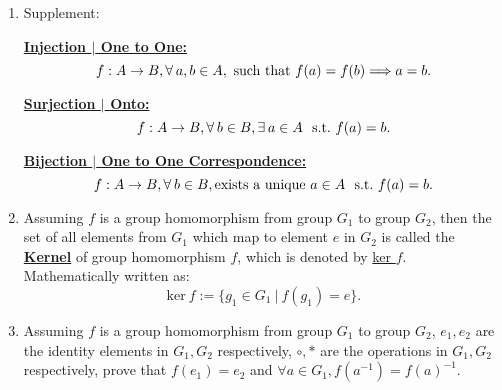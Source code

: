 \documentclass[12pt]{scrartcl}
\begin{document}
{{\begin{enumerate}[label=(\alph*)]
\begin{spacing}{1.2}
\setlength{\leftskip}{0pt}If a \underline{Group Homomorphism} $f$ is a bijection (one-to-one correspondence, invertible), 

\setlength{\leftskip}{24pt}$f$ is called an \underline{\textbf{Isomorphism}}, and $G_1$ and $G_2$ are \underline{\textbf{Isomorphic}}, which is denoted by $G_1 \cong G_2.$
\end{spacing}

	\item Supplement:

\vspace{0.2em}
\underline{\textbf{Injection $|$ One to One:}} $$f: A \rightarrow B, \forall \hspace{0.2em} a, b \in A, \text{~such that }f(a) = f(b) \Longrightarrow a = b.$$

\underline{\textbf{Surjection $|$ Onto:}} $$f: A \rightarrow B, \forall \hspace{0.2em} b \in B, \exists \hspace{0.2em} a \in A \text{~ s.t.} ~ f(a) = b.$$

\underline{\textbf{Bijection $|$ One to One Correspondence:}} $$f: A \rightarrow B, \forall \hspace{0.2em} b \in B, \text{exists a unique} ~ a \in A \text{~ s.t.} ~ f(a) = b.$$

	\item \begin{spacing}{1.3}Assuming $f$ is a group homomorphism from group $G_1$ to group $G_2$, then the set of all elements from $G_1$ which map to element $e$ in $G_2$ is called the \underline{\textbf{Kernel}} of group homomorphism $f$, which is denoted by \underline{ker $f$}. Mathematically written as: $$\text{ker} ~f := \{g_1 \in G_1 ~ | ~ f(g_1) = e\}.$$
\end{spacing}
	


	\item \begin{spacing}{1.2} Assuming $f$ is a group homomorphism from group $G_1$ to group $G_2$, $e_1, e_2$ are the identity elements in $G_1, G_2$ respectively, $\circ, *$ are the operations in $G_1, G_2$ respectively, prove that $f(e_1) = e_2$ and $\forall a \in G_1, f(a^{-1}) = f(a)^{-1}.$

	\vspace{0.5em}
\end{spacing}
\end{enumerate}}}
\end{document}
